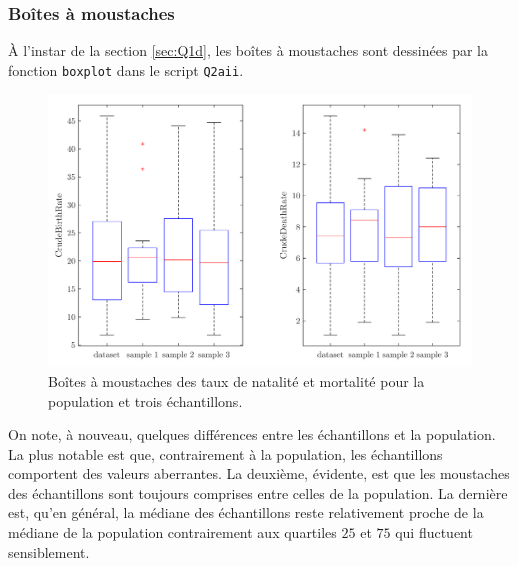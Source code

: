 \documentclass[a4paper, 12pt]{article}
\begin{document}
	\subsubsection{Boîtes à moustaches} \label{sec:Q2aii}
	À l'instar de la section \ref{sec:Q1d}, les boîtes à moustaches sont dessinées par la fonction \texttt{boxplot} dans le script \texttt{Q2aii}. \par
	\begin{figure}[h!]
		\centering
		\includegraphics[scale=0.24]{resources/pdf/q2aii.pdf}
		\caption{Boîtes à moustaches des taux de natalité et mortalité pour la population et trois échantillons.}
		\label{figure:Q2aii}
	\end{figure}
	On note, à nouveau, quelques différences entre les échantillons et la population. La plus notable est que, contrairement à la population, les échantillons comportent des valeurs aberrantes. La deuxième, évidente, est que les moustaches des échantillons sont toujours comprises entre celles de la population. La dernière est, qu'en général, la médiane des échantillons reste relativement proche de la médiane de la population contrairement aux quartiles $25$ et $75$ qui fluctuent sensiblement.
\end{document}
